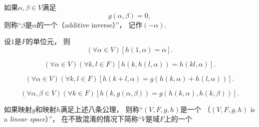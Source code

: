 \begin{definition}
\begin{itemize}
\begin{axiom}[负元的存在性]
			如果\(\alpha,\beta \in V\)满足\begin{equation*}
				g(\alpha,\beta)
				= 0,
			\end{equation*}
			则称“\(\beta\)是\(\alpha\)的一个（additive inverse）”，
			记作\((-\alpha)\).
		\end{axiom}
		\begin{axiom}[域的单位元]\label{definition:线性空间.运算法则5}
			设\(1\)是\(F\)的单位元，
			则\begin{equation*}
				(\forall \alpha \in V)
				[
					h(1,\alpha)
					= \alpha
				].
			\end{equation*}
		\end{axiom}
		\begin{axiom}[纯量乘法结合律]\label{definition:线性空间.运算法则6}
			\begin{equation*}
				(\forall \alpha \in V)
				(\forall k,l \in F)
				[
					h(k,h(l,\alpha))
					= h(k l,\alpha)
				].
			\end{equation*}
		\end{axiom}
		\begin{axiom}[纯量乘法对纯量加法的分配律]\label{definition:线性空间.运算法则7}
			\begin{equation*}
				(\forall \alpha \in V)
				(\forall k,l \in F)
				[
					h(k+l,\alpha)
					= g(
						h(k,\alpha)
						+ h(l,\alpha)
					)
				].
			\end{equation*}
		\end{axiom}
		\begin{axiom}[纯量乘法对向量加法的分配律]\label{definition:线性空间.运算法则8}
			\begin{equation*}
				(\forall \alpha,\beta \in V)
				(\forall k\in F)
				[
					h(k,g(\alpha,\beta))
					= g(
						h(k,\alpha),
						h(k,\beta)
					)
				].
			\end{equation*}
		\end{axiom}
\end{itemize}
\endgroup
如果映射\(g\)和映射\(h\)满足上述八条公理，
则称“\((V,F,g,h)\)是一个%
（\((V,F,g,h)\) is a \emph{linear space}）”，
在不致混淆的情况下简称“\(V\)是域\(F\)上的一个%

\end{definition}
